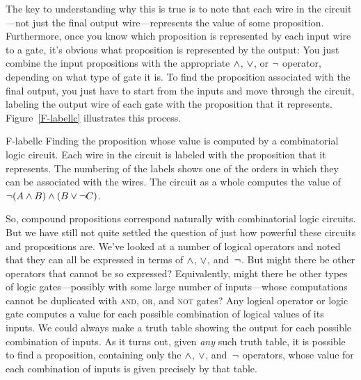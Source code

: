 The key to understanding why this is true
is to note that each wire in the circuit---not just the final
output wire---represents the value of some proposition.  
Furthermore, once you know which proposition is represented by
each input wire to a gate, it's obvious what proposition is
represented by the output: You just combine the input propositions
with the appropriate $\wedge$, $\vee$, or $\lnot$ operator, depending
on what type of gate it is.   To find
the proposition associated with the final output, you just have to
start from the inputs and move through the circuit, labeling the
output wire of each gate with the proposition that it represents.
Figure~\ref{F-labellc} illustrates this process.

\fig
    {F-labellc}
    {Finding the proposition whose value is computed by a
     combinatorial logic circuit.  Each wire in the circuit is
     labeled with the proposition that it represents.  The
     numbering of the labels shows one of the orders in which they 
     can be associated with the wires.  The circuit as a whole
     computes the value of $\lnot(A\wedge B)\wedge(B\vee\lnot C)$.}
    {}

\medbreak
   
So, compound propositions correspond naturally with combinatorial
logic circuits.  But we have still not quite settled the question
of just how powerful these circuits and propositions are.
We've looked at a number of logical operators and noted that they
can all be expressed in terms of $\wedge$, $\vee$, and~$\lnot$.
But might there be other operators that cannot be so expressed?
Equivalently, might there be other types of logic gates---possibly
with some large number of inputs---whose
computations cannot be duplicated with \textsc{and}, \textsc{or}, and
\textsc{not} gates?   Any logical operator or logic gate computes
a value for each possible combination of logical values of its inputs.
We could always make a truth table showing the output for each 
possible combination of inputs.  As it turns out, given \emph{any} such
truth table, it is possible to find a proposition, containing only
the $\wedge$, $\vee$, and~$\lnot$ operators, whose value for each combination
of inputs is given precisely by that table.    

